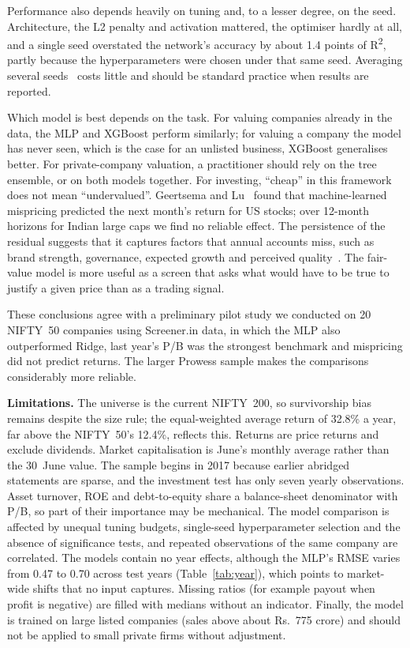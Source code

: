 \documentclass[conference]{IEEEtran}
\begin{document}
Performance also depends heavily on tuning and, to a lesser degree, on the seed. Architecture, the L2 penalty and activation mattered, the optimiser hardly at all, and a single seed overstated the network's accuracy by about 1.4 points of R\textsuperscript{2}, partly because the hyperparameters were chosen under that same seed. Averaging several seeds~\cite{lakshminarayanan2017} costs little and should be standard practice when results are reported.

Which model is best depends on the task. For valuing companies already in the data, the MLP and XGBoost perform similarly; for valuing a company the model has never seen, which is the case for an unlisted business, XGBoost generalises better. For private-company valuation, a practitioner should rely on the tree ensemble, or on both models together. For investing, ``cheap'' in this framework does not mean ``undervalued''. Geertsema and Lu~\cite{geertsema2023} found that machine-learned mispricing predicted the next month's return for US stocks; over 12-month horizons for Indian large caps we find no reliable effect. The persistence of the residual suggests that it captures factors that annual accounts miss, such as brand strength, governance, expected growth and perceived quality~\cite{asness2019}. The fair-value model is more useful as a screen that asks what would have to be true to justify a given price than as a trading signal.

These conclusions agree with a preliminary pilot study we conducted on 20 NIFTY~50 companies using Screener.in data, in which the MLP also outperformed Ridge, last year's P/B was the strongest benchmark and mispricing did not predict returns. The larger Prowess sample makes the comparisons considerably more reliable.

\textbf{Limitations.} The universe is the current NIFTY~200, so survivorship bias remains despite the size rule; the equal-weighted average return of 32.8\% a year, far above the NIFTY~50's 12.4\%, reflects this. Returns are price returns and exclude dividends. Market capitalisation is June's monthly average rather than the 30~June value. The sample begins in 2017 because earlier abridged statements are sparse, and the investment test has only seven yearly observations. Asset turnover, ROE and debt-to-equity share a balance-sheet denominator with P/B, so part of their importance may be mechanical. The model comparison is affected by unequal tuning budgets, single-seed hyperparameter selection and the absence of significance tests, and repeated observations of the same company are correlated. The models contain no year effects, although the MLP's RMSE varies from 0.47 to 0.70 across test years (Table~\ref{tab:year}), which points to market-wide shifts that no input captures. Missing ratios (for example payout when profit is negative) are filled with medians without an indicator. Finally, the model is trained on large listed companies (sales above about Rs.~775 crore) and should not be applied to small private firms without adjustment.
\end{document}
